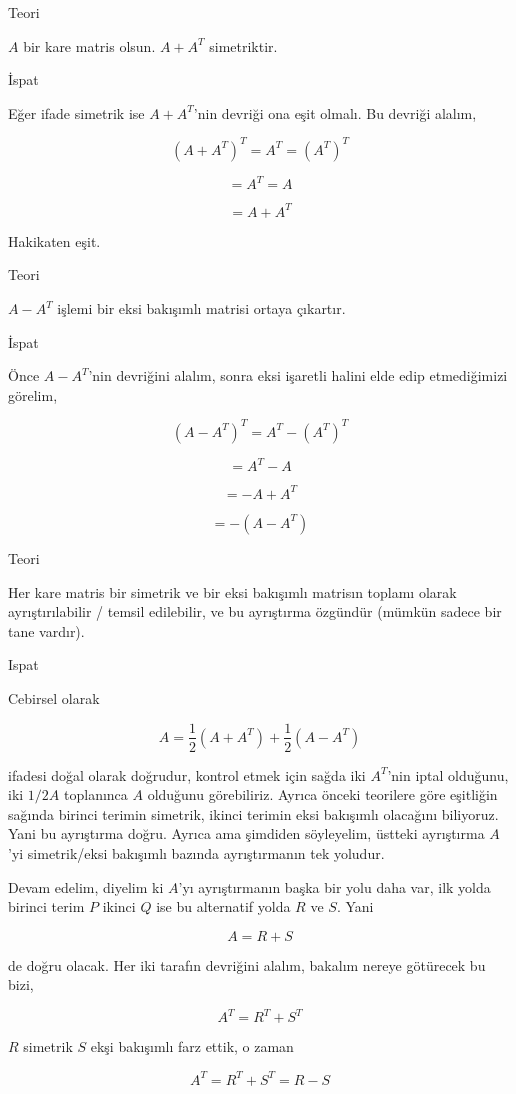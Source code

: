 \documentclass[12pt,fleqn]{article}\usepackage{../../common}
\begin{document}
Teori

$A$ bir kare matris olsun. $A + A^T$ simetriktir.

İspat

Eğer ifade simetrik ise $A + A^T$'nin devriği ona eşit olmalı. Bu devriği alalım,

$$
(A + A^T)^T = A^T = (A^T)^T
$$

$$
= A^T = A
$$

$$
= A + A^T
$$

Hakikaten eşit. 

Teori

$A - A^T$ işlemi bir eksi bakışımlı matrisi ortaya çıkartır.

İspat

Önce $A - A^T$'nin devriğini alalım, sonra eksi işaretli halini elde
edip etmediğimizi görelim,

$$
(A-A^T)^T = A^T - (A^T)^T
$$

$$
= A^T - A
$$

$$
= -A + A^T
$$

$$
= - (A-A^T)
$$

Teori

Her kare matris bir simetrik ve bir eksi bakışımlı matrisın toplamı olarak
ayrıştırılabilir / temsil edilebilir, ve bu ayrıştırma özgündür (mümkün sadece
bir tane vardır).

Ispat

Cebirsel olarak

$$
A = \frac{1}{2} (A + A^T) + \frac{1}{2} (A - A^T)
$$

ifadesi doğal olarak doğrudur, kontrol etmek için sağda iki $A^T$'nin iptal
olduğunu, iki $1/2 A$ toplanınca $A$ olduğunu görebiliriz. Ayrıca önceki
teorilere göre eşitliğin sağında birinci terimin simetrik, ikinci terimin eksi
bakışımlı olacağını biliyoruz. Yani bu ayrıştırma doğru. Ayrıca ama şimdiden
söyleyelim, üstteki ayrıştırma $A$'yi simetrik/eksi bakışımlı bazında
ayrıştırmanın tek yoludur.

Devam edelim, diyelim ki $A$'yı ayrıştırmanın başka bir yolu daha var, ilk yolda
birinci terim $P$ ikinci $Q$ ise bu alternatif yolda $R$ ve $S$. Yani

$$
A = R + S
$$

de doğru olacak. Her iki tarafın devriğini alalım, bakalım nereye götürecek
bu bizi,

$$
A^T = R^T + S^T
$$

$R$ simetrik $S$ ekşi bakışımlı farz ettik, o zaman

$$
A^T = R^T + S^T = R - S
$$
\end{document}
